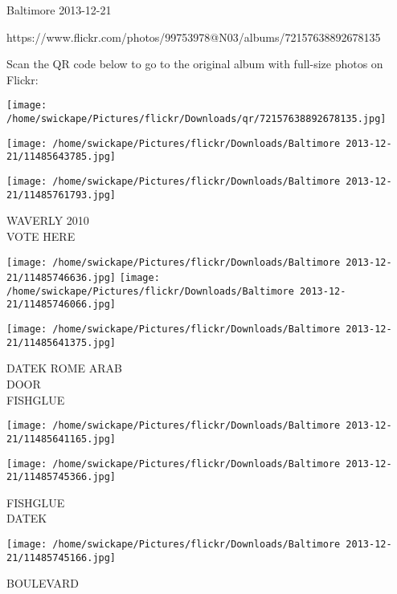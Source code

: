 \documentclass[10pt,letterpaper]{article}
\begin{document}
Baltimore 2013-12-21

https://www.flickr.com/photos/99753978@N03/albums/72157638892678135

Scan the QR code below to go to the original album with full-size photos on Flickr:

\texttt{[image: /home/swickape/Pictures/flickr/Downloads/qr/72157638892678135.jpg]}
\pagebreak

\texttt{[image: /home/swickape/Pictures/flickr/Downloads/Baltimore 2013-12-21/11485643785.jpg]}

\vspace{0.25in}
\texttt{[image: /home/swickape/Pictures/flickr/Downloads/Baltimore 2013-12-21/11485761793.jpg]}

WAVERLY 2010\\
VOTE HERE
\pagebreak

\texttt{[image: /home/swickape/Pictures/flickr/Downloads/Baltimore 2013-12-21/11485746636.jpg]}
\texttt{[image: /home/swickape/Pictures/flickr/Downloads/Baltimore 2013-12-21/11485746066.jpg]}

\texttt{[image: /home/swickape/Pictures/flickr/Downloads/Baltimore 2013-12-21/11485641375.jpg]}

DATEK ROME ARAB\\
DOOR\\
FISHGLUE
\pagebreak

\texttt{[image: /home/swickape/Pictures/flickr/Downloads/Baltimore 2013-12-21/11485641165.jpg]}

\vspace{0.25in}
\texttt{[image: /home/swickape/Pictures/flickr/Downloads/Baltimore 2013-12-21/11485745366.jpg]}

FISHGLUE\\
DATEK
\pagebreak

\texttt{[image: /home/swickape/Pictures/flickr/Downloads/Baltimore 2013-12-21/11485745166.jpg]}

BOULEVARD
\pagebreak
\end{document}
